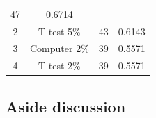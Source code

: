 \documentclass[12pt]{article}
\begin{document}
\begin{longtable}[]{@{}cccc@{}}
\begin{minipage}[t]{0.21\columnwidth}
47\strut
\end{minipage} & \begin{minipage}[t]{0.12\columnwidth}\centering\strut
0.6714\strut
\end{minipage}\tabularnewline
\begin{minipage}[t]{0.09\columnwidth}\centering\strut
2\strut
\end{minipage} & \begin{minipage}[t]{0.17\columnwidth}\centering\strut
T-test 5\%\strut
\end{minipage} & \begin{minipage}[t]{0.21\columnwidth}\centering\strut
43\strut
\end{minipage} & \begin{minipage}[t]{0.12\columnwidth}\centering\strut
0.6143\strut
\end{minipage}\tabularnewline
\begin{minipage}[t]{0.09\columnwidth}\centering\strut
3\strut
\end{minipage} & \begin{minipage}[t]{0.17\columnwidth}\centering\strut
Computer 2\%\strut
\end{minipage} & \begin{minipage}[t]{0.21\columnwidth}\centering\strut
39\strut
\end{minipage} & \begin{minipage}[t]{0.12\columnwidth}\centering\strut
0.5571\strut
\end{minipage}\tabularnewline
\begin{minipage}[t]{0.09\columnwidth}\centering\strut
4\strut
\end{minipage} & \begin{minipage}[t]{0.17\columnwidth}\centering\strut
T-test 2\%\strut
\end{minipage} & \begin{minipage}[t]{0.21\columnwidth}\centering\strut
39\strut
\end{minipage} & \begin{minipage}[t]{0.12\columnwidth}\centering\strut
0.5571\strut
\end{minipage}\tabularnewline
\bottomrule
\end{longtable}

\subsection{Aside discussion}\label{aside-discussion}
\end{document}
